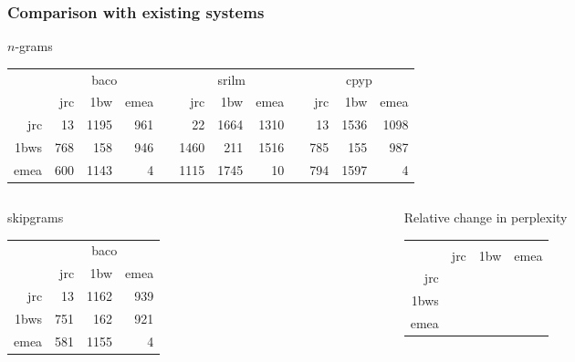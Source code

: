 \begin{frame}
    \frametitle{Comparison with existing systems}

    \begin{block}{$n$-grams}
    {\small
        \begin{tabular}{rrrrm{0.01cm}rrrm{0.01cm}rrr}
            & \multicolumn{3}{c}{baco} & & \multicolumn{3}{c}{srilm} & & \multicolumn{3}{c}{cpyp} \\
                  & jrc & 1bw  & emea & & jrc  & 1bw  & emea & & jrc & 1bw  & emea \\ \cline{2-4}\cline{6-8}\cline{10-12}
            jrc   & 13  & 1195 & 961  & & 22   & 1664 & 1310 & & 13  & 1536 & 1098 \\
            1bws  & 768 & 158  & 946  & & 1460 & 211  & 1516 & & 785 & 155  & 987 \\
            emea  & 600 & 1143 & 4    & & 1115 & 1745 & 10   & & 794 & 1597 & 4
        \end{tabular}
    }
    \end{block}
    
\begin{columns}[T] %
\begin{column}{.48\textwidth}
    \begin{block}{skipgrams}
    {\small
        \begin{tabular}{rrrr}
            & \multicolumn{3}{c}{baco} \\
                  & jrc & 1bw  & emea \\ \cline{2-4}
            jrc   & 13  & 1162 & 939  \\
            1bws  & 751 & 162  & 921  \\
            emea  & 581 & 1155 & 4    
        \end{tabular}
    }
    \end{block}

\end{column}%
\hfill%
\begin{column}{.48\textwidth}
    \begin{block}{Relative change in perplexity}
    {\small
        \begin{tabular}{rrrr}
            & \multicolumn{3}{c}{} \\
                  & jrc  & 1bw  & emea \\ \cline{2-4}
            jrc   & \cellcolor{red!25}{2.03}   & \cellcolor{green!25}{2.80} & \cellcolor{green!25}{2.30} \\
            1bws  & \cellcolor{green!25}{2.23} & \cellcolor{red!25}{2.38}   & \cellcolor{green!25}{2.63} \\
            emea  & \cellcolor{green!25}{3.20} & \cellcolor{red!25}{1.09}   & \cellcolor{red!25}{0.67}    
        \end{tabular}
    }
    \end{block}
\end{column}%
\end{columns}





\end{frame}
